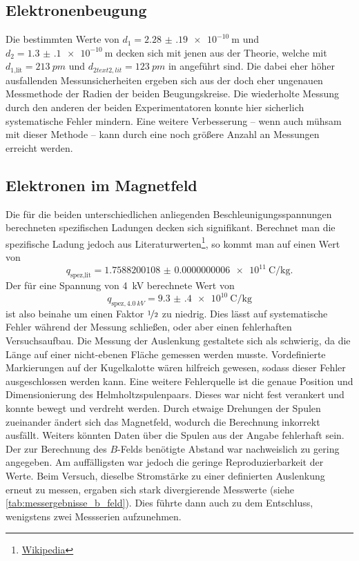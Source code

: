\documentclass[ngerman]{scrartcl}
\begin{document}
\subsection{Elektronenbeugung}
\label{subsec:diskussion_elektronenbeugung}

Die bestimmten Werte von $d_1 = \SI{2.28(19)e-10}{\meter}$ und $d_2 = \SI{1.3(1)e-10}{\meter}$ decken sich mit jenen aus der Theorie, welche mit $d_{\text{1,lit}} = \SI{213}{pm}$ und $d_{2text{2,lit}} = \SI{123}{pm}$ in \cite{ref:angabe_elektronen} angeführt sind. Die dabei eher höher ausfallenden Messunsicherheiten ergeben sich aus der doch eher ungenauen Messmethode der Radien der beiden Beugungskreise. Die wiederholte Messung durch den anderen der beiden Experimentatoren konnte hier sicherlich systematische Fehler mindern. Eine weitere Verbesserung -- wenn auch mühsam mit dieser Methode -- kann durch eine noch größere Anzahl an Messungen erreicht werden.


\subsection{Elektronen im Magnetfeld}
\label{subsec:diskussion_elektronen_im_magnetfeld}

Die für die beiden unterschiedlichen anliegenden Beschleunigungsspannungen berechneten spezifischen Ladungen decken sich signifikant. Berechnet man die spezifische Ladung jedoch aus Literaturwerten\footnote{\href{https://de.wikipedia.org/wiki/Elektron}{Wikipedia}}, so kommt man auf einen Wert von
\[q_{\text{spez,lit}} = \SI{1.7588200108(6)e+11}{\coulomb\per\kilo\gram}.\]
Der für eine Spannung von \SI{4}{kV} berechnete Wert von
\[q_{\text{spez},\SI{4.0}{kV}} = \SI{9.3(4)e10}{\coulomb\per\kilo\gram}\]
ist also beinahe um einen Faktor $\nicefrac{1}{2}$ zu niedrig. Dies lässt auf systematische Fehler während der Messung schließen, oder aber einen fehlerhaften Versuchsaufbau.
Die Messung der Auslenkung gestaltete sich als schwierig, da die Länge auf einer nicht-ebenen Fläche gemessen werden musste. Vordefinierte Markierungen auf der Kugelkalotte wären hilfreich gewesen, sodass dieser Fehler ausgeschlossen werden kann. Eine weitere Fehlerquelle ist die genaue Position und Dimensionierung des Helmholtzspulenpaars. Dieses war nicht fest verankert und konnte bewegt und verdreht werden. Durch etwaige Drehungen der Spulen zueinander ändert sich das Magnetfeld, wodurch die Berechnung inkorrekt ausfällt. Weiters könnten Daten über die Spulen aus der Angabe fehlerhaft sein. Der zur Berechnung des $B$-Felds benötigte Abstand war nachweislich zu gering angegeben. Am auffälligsten war jedoch die geringe Reproduzierbarkeit der Werte. Beim Versuch, dieselbe Stromstärke zu einer definierten Auslenkung erneut zu messen, ergaben sich stark divergierende Messwerte (siehe \autoref{tab:messergebnisse_b_feld}). Dies führte dann auch zu dem Entschluss, wenigstens zwei Messserien aufzunehmen.
\end{document}
